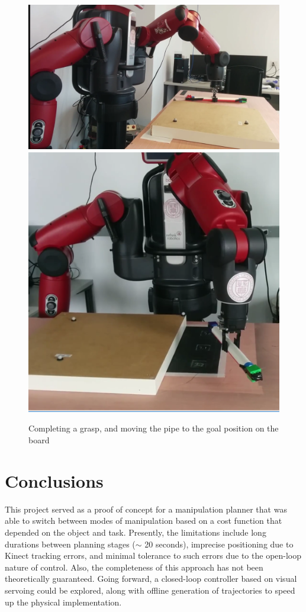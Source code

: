 \documentclass[runningheads,letterpaper]{llncs}
\begin{document}
\begin{figure}[ht]
\centering
	\includegraphics[height=0.3\columnwidth]{images/grasp.png}
	\includegraphics[height=0.3\columnwidth]{images/grasp_lift.png}	
\caption{Completing a grasp, and moving the pipe to the goal position on the board}
\label{fig:grasp}
\end{figure}

\section{Conclusions}
This project served as a proof of concept for a manipulation planner that was able to switch between modes of manipulation based on a cost function that depended on the object and task. Presently, the limitations include long durations between planning stages ($\sim$ 20 seconds), imprecise positioning due to Kinect tracking errors, and minimal tolerance to such errors due to the open-loop nature of control. Also, the completeness of this approach has not been theoretically guaranteed.
Going forward, a closed-loop controller based on visual servoing could be explored, along with offline generation of trajectories to speed up the physical implementation. 


\end{document}
